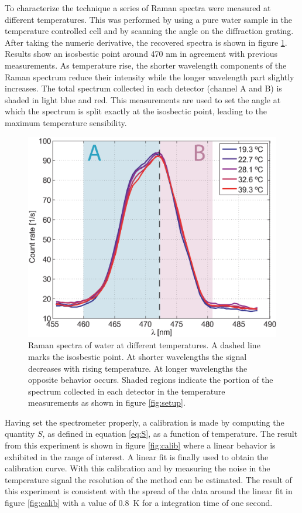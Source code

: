 \documentclass[twocolumn]{svjour3}       %
\begin{document}
To characterize the technique a series of Raman spectra were measured at different temperatures. This was performed by using a pure water sample in the temperature controlled cell and by scanning the angle on the diffraction grating. After taking the numeric derivative, the recovered spectra is shown in figure \ref{fig:spectra}. Results show an isosbestic point around 470 nm in agreement with previous measurements\cite{walrafen1}. As temperature rise, the shorter wavelength components of the Raman spectrum reduce their intensity while the longer wavelength part slightly increases. The total spectrum collected in each detector (channel A and B) is shaded in light blue and red. This measurements are used to set the angle at which the spectrum is split exactly at the isosbectic point, leading to the maximum temperature sensibility. 

\begin{figure}[h!]
\centering
\includegraphics[width=\columnwidth]{figs/spectra.eps}
\caption{Raman spectra of water at different temperatures. A dashed line marks the isosbestic point. At shorter wavelengths the signal decreases with rising temperature. At longer wavelengths the opposite behavior occurs. Shaded regions indicate the portion of the spectrum collected in each detector in the temperature measurements as shown in figure \ref{fig:setup}.\label{fig:spectra}}
\end{figure}

Having set the spectrometer properly, a calibration is made by computing the quantity $S$, as defined in equation \ref{eq:S}, as a function of temperature. The result from this experiment is shown in figure \ref{fig:calib} where a linear behavior is exhibited in the range of interest. A linear fit is finally used to obtain the calibration curve. With this calibration and by measuring the noise in the temperature signal  the resolution of the method can be estimated. The result of this experiment is consistent with the spread of the data around the linear fit in figure \ref{fig:calib} with a value of 0.8~K for a integration time of one second.
\end{document}
